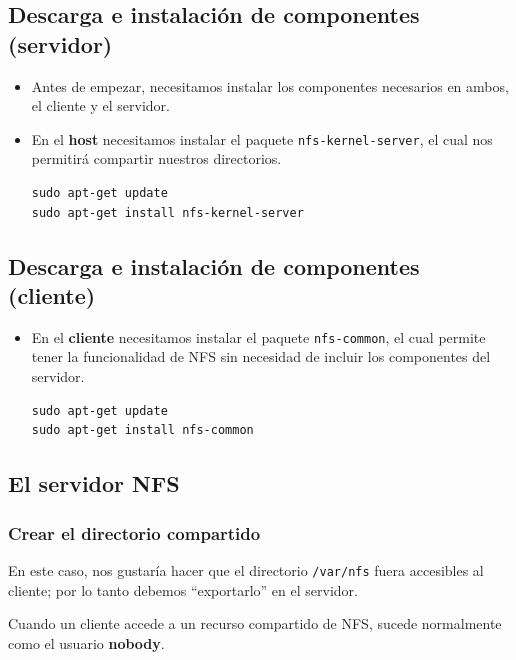 \documentclass[a4paper,11pt]{article}
\begin{document}
\subsection{Descarga e instalación de componentes (servidor)}
\begin{itemize}
\item Antes de empezar, necesitamos instalar los componentes necesarios en
      ambos, el cliente y el servidor.
\item En el \textbf{host} necesitamos instalar el paquete
\texttt{nfs-kernel-server}, el cual nos permitirá compartir nuestros
directorios.
\begin{verbatim}
sudo apt-get update
sudo apt-get install nfs-kernel-server
\end{verbatim}
\end{itemize}

\subsection{Descarga e instalación de componentes (cliente)}
\begin{itemize}
\item En el \textbf{cliente} necesitamos instalar el paquete
            \texttt{nfs-common}, el cual permite tener la funcionalidad de NFS
            sin necesidad de incluir los componentes del servidor.
\begin{verbatim}
sudo apt-get update
sudo apt-get install nfs-common

\end{verbatim}
\end{itemize}

\subsection{El servidor NFS}
\subsubsection{Crear el directorio compartido}
En este caso, nos gustaría hacer que el directorio \texttt{/var/nfs} fuera
accesibles al cliente; por lo tanto  debemos ``exportarlo'' en el servidor.

Cuando un cliente accede a un recurso compartido de NFS, sucede normalmente como
el usuario \textbf{nobody}. 
\end{document}
